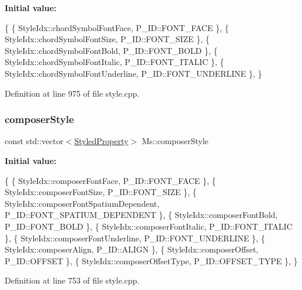 {\bfseries Initial value\+:}
\begin{DoxyCode}
\{
      \{ StyleIdx::chordSymbolFontFace,                P\_ID::FONT\_FACE              \},
      \{ StyleIdx::chordSymbolFontSize,                P\_ID::FONT\_SIZE              \},
      \{ StyleIdx::chordSymbolFontBold,                P\_ID::FONT\_BOLD              \},
      \{ StyleIdx::chordSymbolFontItalic,              P\_ID::FONT\_ITALIC            \},
      \{ StyleIdx::chordSymbolFontUnderline,           P\_ID::FONT\_UNDERLINE         \},
      \}
\end{DoxyCode}


Definition at line 975 of file style.\+cpp.

\mbox{\label{namespace_ms_a12ad8d3765fa37abb0815d41624ee745}} 
\subsubsection{\texorpdfstring{composer\+Style}{composerStyle}}
{\footnotesize\ttfamily const std\+::vector$<$\hyperlink{struct_ms_1_1_styled_property}{Styled\+Property}$>$ Ms\+::composer\+Style}

{\bfseries Initial value\+:}
\begin{DoxyCode}
\{
      \{ StyleIdx::composerFontFace,                   P\_ID::FONT\_FACE              \},
      \{ StyleIdx::composerFontSize,                   P\_ID::FONT\_SIZE              \},
      \{ StyleIdx::composerFontSpatiumDependent,       P\_ID::FONT\_SPATIUM\_DEPENDENT \},
      \{ StyleIdx::composerFontBold,                   P\_ID::FONT\_BOLD              \},
      \{ StyleIdx::composerFontItalic,                 P\_ID::FONT\_ITALIC            \},
      \{ StyleIdx::composerFontUnderline,              P\_ID::FONT\_UNDERLINE         \},
      \{ StyleIdx::composerAlign,                      P\_ID::ALIGN                  \},
      \{ StyleIdx::composerOffset,                     P\_ID::OFFSET                 \},
      \{ StyleIdx::composerOffsetType,                 P\_ID::OFFSET\_TYPE            \},
      \}
\end{DoxyCode}


Definition at line 753 of file style.\+cpp.

\mbox{\label{namespace_ms_a6517e4ba2abc476fe0781790618b6306}} 
